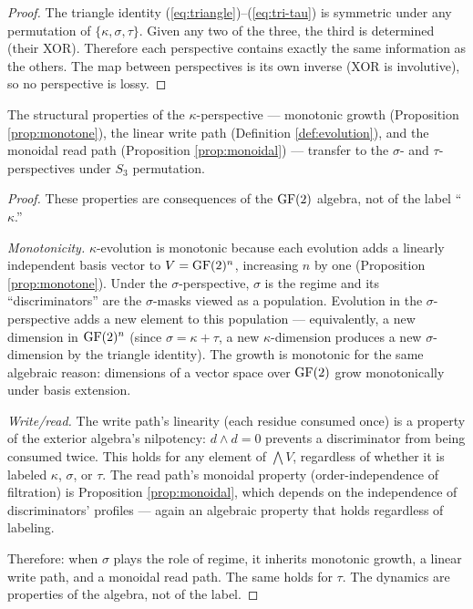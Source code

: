 \begin{proof}
The triangle identity (\ref{eq:triangle})--(\ref{eq:tri-tau})
is symmetric under any permutation of $\{\kappa, \sigma, \tau\}$.
Given any two of the three, the third is determined (their
XOR). Therefore each perspective contains exactly the same
information as the others. The map between perspectives is
its own inverse (XOR is involutive), so no perspective is
lossy.
\end{proof}

\begin{proposition}
\label{prop:dynamics-transfer}
The structural properties of the $\kappa$-perspective ---
monotonic growth (Proposition \ref{prop:monotone}), the
linear write path (Definition \ref{def:evolution}), and
the monoidal read path (Proposition \ref{prop:monoidal})
--- transfer to the $\sigma$- and $\tau$-perspectives
under $S_3$ permutation.
\end{proposition}

\begin{proof}
These properties are consequences of the $\operatorname{GF}(2)$
algebra, not of the label ``$\kappa$.''

\emph{Monotonicity.} $\kappa$-evolution is monotonic
because each evolution adds a linearly independent basis
vector to $V = \operatorname{GF}(2)^n$, increasing $n$ by one
(Proposition \ref{prop:monotone}). Under the
$\sigma$-perspective, $\sigma$ is the regime and its
``discriminators'' are the $\sigma$-masks viewed as a
population. Evolution in the $\sigma$-perspective adds a
new element to this population --- equivalently, a new
dimension in $\operatorname{GF}(2)^n$ (since $\sigma = \kappa + \tau$,
a new $\kappa$-dimension produces a new $\sigma$-dimension
by the triangle identity). The growth is monotonic for the
same algebraic reason: dimensions of a vector space over
$\operatorname{GF}(2)$ grow monotonically under basis extension.

\emph{Write/read.} The write path's linearity (each
residue consumed once) is a property of the exterior
algebra's nilpotency: $d \wedge d = 0$ prevents a
discriminator from being consumed twice. This holds for
any element of $\bigwedge V$, regardless of whether it is
labeled $\kappa$, $\sigma$, or $\tau$. The read path's
monoidal property (order-independence of filtration) is
Proposition \ref{prop:monoidal}, which depends on the
independence of discriminators' profiles --- again an
algebraic property that holds regardless of labeling.

Therefore: when $\sigma$ plays the role of regime, it
inherits monotonic growth, a linear write path, and a
monoidal read path. The same holds for $\tau$. The
dynamics are properties of the algebra, not of the label.
\end{proof}

